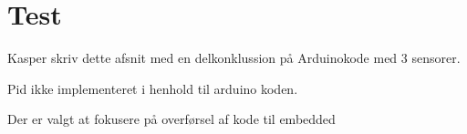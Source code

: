 \section{Test}

Kasper skriv dette afsnit med en delkonklussion på Arduinokode med 3 sensorer. 


Pid ikke implementeret i henhold til arduino koden. 



Der er valgt at fokusere på overførsel af kode til embedded 

